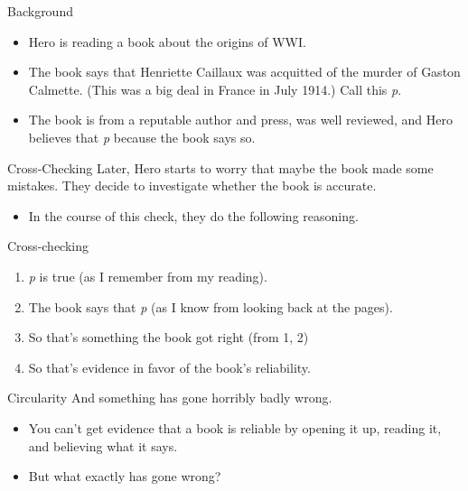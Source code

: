 \documentclass[
  17pt,
  letterpaper,
  ignorenonframetext,
  aspectratio=169,
  handout,
  xcolor={dvipsnames}]{beamer}
\providecommand{\tightlist}{%
  \setlength{\itemsep}{0pt}\setlength{\parskip}{0pt}}\usepackage{longtable,booktabs,array}
\begin{document}
\begin{frame}{Background}
\protect\hypertarget{background}{}
\begin{itemize}[<+->]
\tightlist
\item
  Hero is reading a book about the origins of WWI.
\item
  The book says that Henriette Caillaux was acquitted of the murder of
  Gaston Calmette. (This was a big deal in France in July 1914.) Call
  this \emph{p}.
\item
  The book is from a reputable author and press, was well reviewed, and
  Hero believes that \emph{p} because the book says so.
\end{itemize}
\end{frame}

\begin{frame}{Cross-Checking}
\protect\hypertarget{cross-checking}{}
Later, Hero starts to worry that maybe the book made some mistakes. They
decide to investigate whether the book is accurate.

\begin{itemize}[<+->]
\tightlist
\item
  In the course of this check, they do the following reasoning.
\end{itemize}
\end{frame}

\begin{frame}{Cross-checking}
\protect\hypertarget{cross-checking-1}{}
\begin{enumerate}[<+->]
\tightlist
\item
  \emph{p} is true (as I remember from my reading).
\item
  The book says that \emph{p} (as I know from looking back at the
  pages).
\item
  So that's something the book got right (from 1, 2)
\item
  So that's evidence in favor of the book's reliability.
\end{enumerate}
\end{frame}

\begin{frame}{Circularity}
\protect\hypertarget{circularity-1}{}
And something has gone horribly badly wrong.

\begin{itemize}[<+->]
\tightlist
\item
  You can't get evidence that a book is reliable by opening it up,
  reading it, and believing what it says.
\item
  But what exactly has gone wrong?
\end{itemize}
\end{frame}
\end{document}
